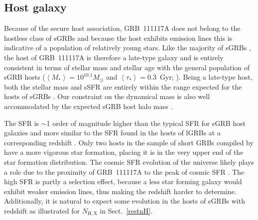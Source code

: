 \documentclass{aa}    %
\begin{document}
\subsection{Host galaxy}

Because of the secure host association, GRB~111117A does not belong to the
hostless class of sGRBs \citep{Berger2010a} and because the host exhibits
emission lines this is indicative of a population of relatively young stars.
Like the majority of sGRBs \citep{Fong2013b}, the host of GRB~111117A is
therefore a late-type galaxy and is entirely consistent in terms of stellar mass
and stellar age with the general population of sGRB hosts ($\left\langle M _*
\right\rangle = 10^{10.1} M_{\odot}$ and $\left\langle \tau _* \right\rangle =
0.3 $~Gyr; \citealt{Leibler2010}). Being a late-type host, both the stellar mass
and sSFR are entirely within the range expected for the hosts of sGRBs
\citep{Behroozi2014}. Our constraint on the dynamical mass is also well
accommodated by the expected sGRB host halo mass \citep{Behroozi2014}.

The SFR is $\sim$1 order of magnitude higher than the typical SFR for sGRB host
galaxies \citep{Berger2014} and more similar to the SFR found in the hosts of
lGRBs at a corresponding redshift \citep{Kruhler2015}. Only two hosts in the
sample of short GRBs compiled by \citet{Berger2014} have a more vigorous star
formation, placing it is in the very upper end of the star formation
distribution. The cosmic SFR evolution of the universe likely plays a role due
to the proximity of GRB~111117A to the peak of cosmic SFR \citep{Madau2014}.
The high SFR is partly a selection effect, because a less star forming galaxy
would exhibit weaker emission lines, thus making the redshift harder to
determine. Additionally, it is natural to expect some evolution in the hosts of
sGRBs with redshift as illustrated for $N_\mathrm{H,X}$ in Sect.~\ref{restnH}.
\end{document}
